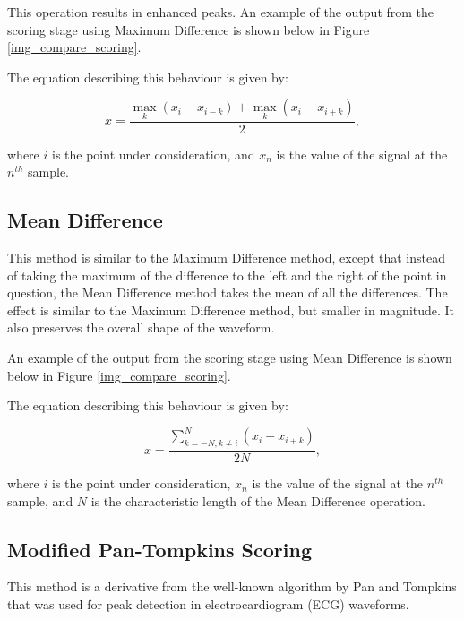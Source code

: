                 This operation results in enhanced peaks. An example of the output from the scoring stage using Maximum Difference is shown below in Figure \ref{img_compare_scoring}.

                The equation describing this behaviour is given by:

                \begin{equation}
                x = \frac{\max\limits_k{(x_i - x_{i-k})} + \max\limits_k{(x_i - x_{i+k})}}{2},
                \end{equation}

                where $i$ is the point under consideration, and $x_n$ is the value of the signal at the $n^{th}$ sample.
              

            \subsection{Mean Difference}

                This method is similar to the Maximum Difference method, except that instead of taking the maximum of the difference to the left and the right of the point in question, the Mean Difference method takes the mean of all the differences. The effect is similar to the Maximum Difference method, but smaller in magnitude. It also preserves the overall shape of the waveform.

                An example of the output from the scoring stage using Mean Difference is shown below in Figure \ref{img_compare_scoring}.

                The equation describing this behaviour is given by:

                \begin{equation}
                x = \frac{\sum_{k=-N, k\neq i}^{N} (x_i - x_{i+k})}{2N},
                \end{equation}

                where $i$ is the point under consideration, $x_n$ is the value of the signal at the $n^{th}$ sample, and $N$ is the characteristic length of the Mean Difference operation.


            \subsection{Modified Pan-Tompkins Scoring}

                This method is a derivative from the well-known algorithm by Pan and Tompkins \cite{pan-tompkins} that was used for peak detection in electrocardiogram (ECG) waveforms. 

